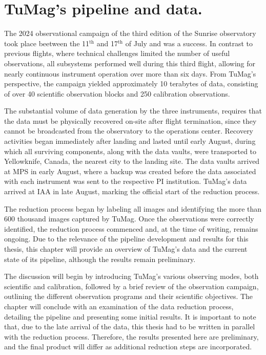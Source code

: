 \chapter{\label{CH:Pipeline}TuMag's pipeline and data.}


The 2024 observational campaign of the third edition of the Sunrise observatory took place beetween the 11$^{\text{th}}$ and 17$^{\text{th}}$ of July and was a success. In contrast to previous flights, where technical challenges limited the number of useful observations, all subsystems performed well during this third flight, allowing for nearly continuous instrument operation over more than six days. From TuMag’s perspective, the campaign yielded approximately 10 terabytes of data, consisting of over 40 scientific observation blocks and 250 calibration observations.

The substantial volume of data generation by the three instruments, requires that the data must be physically recovered on-site after flight termination, since they cannot be broadcasted from the observatory to the operations center. Recovery activities began immediately after landing and lasted until early August, during which all surviving components, along with the data vaults, were transported to Yellowknife, Canada, the nearest city to the landing site. The data vaults arrived at MPS in early August, where a backup was created before the data associated with each instrument was sent to the respective PI institution. TuMag’s data arrived at  IAA in late August, marking the official start of the reduction process.

The reduction process began by labeling all images and identifying the more than 600 thousand images captured by TuMag. Once the observations were correctly identified, the reduction process commenced and, at the time of writing, remains ongoing. Due to the relevance of the pipeline development and results for this thesis, this chapter will provide an overview of TuMag's data and the current state of its pipeline, although the results remain preliminary.

The discussion will begin by introducing TuMag’s various observing modes, both scientific and calibration, followed by a brief review of the observation campaign, outlining the different observation programs and their scientific objectives. The chapter will conclude with an examination of the data reduction process, detailing the pipeline and presenting some initial results. It is important to note that, due to the late arrival of the data, this thesis had to be written in parallel with the reduction process. Therefore, the results presented here are preliminary, and the final product will differ as additional reduction steps are incorporated.

